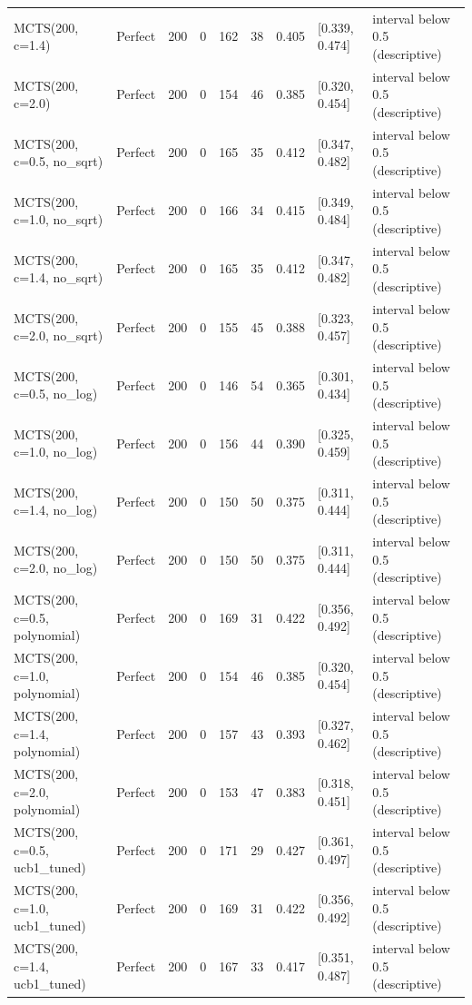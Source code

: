 \begin{table}[!t]
\begin{tabular}{llrrrrrll}
MCTS(200, c=1.4) & Perfect & 200 & 0 & 162 & 38 & 0.405 & [0.339, 0.474] & interval below 0.5 (descriptive) \\
MCTS(200, c=2.0) & Perfect & 200 & 0 & 154 & 46 & 0.385 & [0.320, 0.454] & interval below 0.5 (descriptive) \\
MCTS(200, c=0.5, no\_sqrt) & Perfect & 200 & 0 & 165 & 35 & 0.412 & [0.347, 0.482] & interval below 0.5 (descriptive) \\
MCTS(200, c=1.0, no\_sqrt) & Perfect & 200 & 0 & 166 & 34 & 0.415 & [0.349, 0.484] & interval below 0.5 (descriptive) \\
MCTS(200, c=1.4, no\_sqrt) & Perfect & 200 & 0 & 165 & 35 & 0.412 & [0.347, 0.482] & interval below 0.5 (descriptive) \\
MCTS(200, c=2.0, no\_sqrt) & Perfect & 200 & 0 & 155 & 45 & 0.388 & [0.323, 0.457] & interval below 0.5 (descriptive) \\
MCTS(200, c=0.5, no\_log) & Perfect & 200 & 0 & 146 & 54 & 0.365 & [0.301, 0.434] & interval below 0.5 (descriptive) \\
MCTS(200, c=1.0, no\_log) & Perfect & 200 & 0 & 156 & 44 & 0.390 & [0.325, 0.459] & interval below 0.5 (descriptive) \\
MCTS(200, c=1.4, no\_log) & Perfect & 200 & 0 & 150 & 50 & 0.375 & [0.311, 0.444] & interval below 0.5 (descriptive) \\
MCTS(200, c=2.0, no\_log) & Perfect & 200 & 0 & 150 & 50 & 0.375 & [0.311, 0.444] & interval below 0.5 (descriptive) \\
MCTS(200, c=0.5, polynomial) & Perfect & 200 & 0 & 169 & 31 & 0.422 & [0.356, 0.492] & interval below 0.5 (descriptive) \\
MCTS(200, c=1.0, polynomial) & Perfect & 200 & 0 & 154 & 46 & 0.385 & [0.320, 0.454] & interval below 0.5 (descriptive) \\
MCTS(200, c=1.4, polynomial) & Perfect & 200 & 0 & 157 & 43 & 0.393 & [0.327, 0.462] & interval below 0.5 (descriptive) \\
MCTS(200, c=2.0, polynomial) & Perfect & 200 & 0 & 153 & 47 & 0.383 & [0.318, 0.451] & interval below 0.5 (descriptive) \\
MCTS(200, c=0.5, ucb1\_tuned) & Perfect & 200 & 0 & 171 & 29 & 0.427 & [0.361, 0.497] & interval below 0.5 (descriptive) \\
MCTS(200, c=1.0, ucb1\_tuned) & Perfect & 200 & 0 & 169 & 31 & 0.422 & [0.356, 0.492] & interval below 0.5 (descriptive) \\
MCTS(200, c=1.4, ucb1\_tuned) & Perfect & 200 & 0 & 167 & 33 & 0.417 & [0.351, 0.487] & interval below 0.5 (descriptive) \\

\end{tabular}
\end{table}
